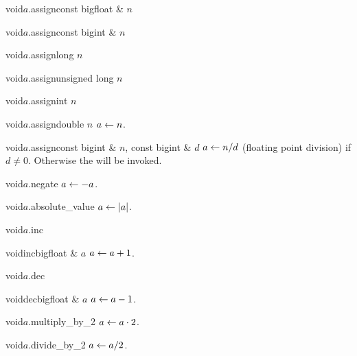 \begin{fcode}{void}{$a$.assign}{const bigfloat & $n$}\end{fcode}
\begin{fcode}{void}{$a$.assign}{const bigint & $n$}\end{fcode}
\begin{fcode}{void}{$a$.assign}{long $n$}\end{fcode}
\begin{fcode}{void}{$a$.assign}{unsigned long $n$}\end{fcode}
\begin{fcode}{void}{$a$.assign}{int $n$}\end{fcode}
\begin{fcode}{void}{$a$.assign}{double $n$}
  $a \leftarrow n$.
\end{fcode}

\begin{fcode}{void}{$a$.assign}{const bigint & $n$, const bigint & $d$}
  $a \leftarrow n / d$ (floating point division) if $d \neq 0$.  Otherwise the \LEH will be invoked.
\end{fcode}



\MODF

\begin{fcode}{void}{$a$.negate}{}
  $a \leftarrow -a$.
\end{fcode}

\begin{fcode}{void}{$a$.absolute_value}{}
  $a \leftarrow |a|$.
\end{fcode}

\begin{fcode}{void}{$a$.inc}{}
\end{fcode}
\begin{fcode}{void}{inc}{bigfloat & $a$}
  $a \leftarrow a + 1$.
\end{fcode}

\begin{fcode}{void}{$a$.dec}{}\end{fcode}
\begin{fcode}{void}{dec}{bigfloat & $a$}
  $a \leftarrow a - 1$.
\end{fcode}

\begin{fcode}{void}{$a$.multiply_by_2}{}
  $a \leftarrow a \cdot 2$.
\end{fcode}

\begin{fcode}{void}{$a$.divide_by_2}{}
  $a \leftarrow a / 2$.
\end{fcode}

